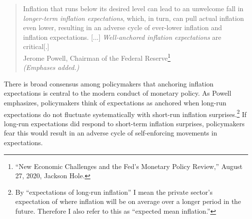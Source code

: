 \documentclass[11pt]{article}
\renewcommand{\[}{\begin{equation}}
\renewcommand{\]}{\end{equation}}
\begin{document}
\begin{quote}
Inflation that runs below its desired level can lead to an unwelcome fall in \emph{longer-term inflation expectations}, which, in turn, can pull actual inflation even lower, resulting in an adverse cycle of ever-lower inflation and inflation expectations.
[...]  \emph{Well-anchored inflation expectations} are critical[.]  \\
Jerome Powell, Chairman of the Federal Reserve\footnote{``New Economic Challenges and the Fed's Monetary Policy Review,''  August 27, 2020, Jackson Hole.} \\
\emph{(Emphases added.)}
\end{quote}	


There is broad consensus among policymakers that anchoring inflation expectations is central to the modern conduct of monetary policy. As Powell emphasizes, policymakers think of expectations as anchored when long-run expectations do not fluctuate systematically with short-run inflation surprises.\footnote{By ``expectations of long-run inflation'' I mean the private sector's expectation of where inflation will be on average over a longer period in the future. Therefore I also refer to this as ``expected mean inflation.''} If long-run expectations did respond to short-term inflation surprises, policymakers fear this would result in an adverse cycle of self-enforcing movements in expectations.
\end{document}
